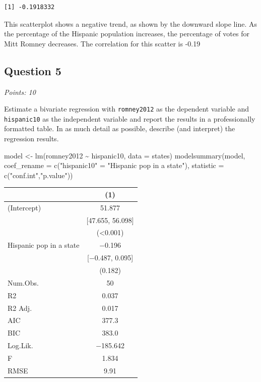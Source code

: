 \documentclass[
  letterpaper,
  DIV=11,
  numbers=noendperiod]{scrartcl}
\newenvironment{Shaded}{\begin{snugshade}}{\end{snugshade}}
\newcommand{\AttributeTok}[1]{\textcolor[rgb]{0.40,0.45,0.13}{#1}}
\newcommand{\FunctionTok}[1]{\textcolor[rgb]{0.28,0.35,0.67}{#1}}
\newcommand{\NormalTok}[1]{\textcolor[rgb]{0.00,0.23,0.31}{#1}}
\newcommand{\OtherTok}[1]{\textcolor[rgb]{0.00,0.23,0.31}{#1}}
\newcommand{\SpecialCharTok}[1]{\textcolor[rgb]{0.37,0.37,0.37}{#1}}
\newcommand{\StringTok}[1]{\textcolor[rgb]{0.13,0.47,0.30}{#1}}
\begin{document}
\begin{verbatim}
[1] -0.1918332
\end{verbatim}

This scatterplot shows a negative trend, as shown by the downward slope
line. As the percentage of the Hispanic population increases, the
percentage of votes for Mitt Romney decreases. The correlation for this
scatter is -0.19

\hypertarget{question-5}{%
\subsection{Question 5}\label{question-5}}

\emph{Points: 10}

Estimate a bivariate regression with \texttt{romney2012} as the
dependent variable and \texttt{hispanic10} as the independent variable
and report the results in a professionally formatted table. In as much
detail as possible, describe (and interpret) the regression results.

\begin{Shaded}
\begin{Highlighting}[]
\NormalTok{model }\OtherTok{\textless{}{-}} \FunctionTok{lm}\NormalTok{(romney2012 }\SpecialCharTok{\textasciitilde{}}\NormalTok{ hispanic10, }\AttributeTok{data =}\NormalTok{ states)}
\FunctionTok{modelsummary}\NormalTok{(model,}
             \AttributeTok{coef\_rename =} \FunctionTok{c}\NormalTok{(}\StringTok{"hispanic10"} \OtherTok{=} \StringTok{"Hispanic pop in a state"}\NormalTok{),}
             \AttributeTok{statistic =} \FunctionTok{c}\NormalTok{(}\StringTok{"conf.int"}\NormalTok{,}\StringTok{"p.value"}\NormalTok{))}
\end{Highlighting}
\end{Shaded}

\begin{table}
\centering
\begin{tabular}[t]{lc}
\toprule
  & (1)\\
\midrule
(Intercept) & \num{51.877}\\
 & {}[\num{47.655}, \num{56.098}]\\
 & (\num{<0.001})\\
Hispanic pop in a state & \num{-0.196}\\
 & {}[\num{-0.487}, \num{0.095}]\\
 & (\num{0.182})\\
\midrule
Num.Obs. & \num{50}\\
R2 & \num{0.037}\\
R2 Adj. & \num{0.017}\\
AIC & \num{377.3}\\
BIC & \num{383.0}\\
Log.Lik. & \num{-185.642}\\
F & \num{1.834}\\
RMSE & \num{9.91}\\
\bottomrule
\end{tabular}
\end{table}
\end{document}
